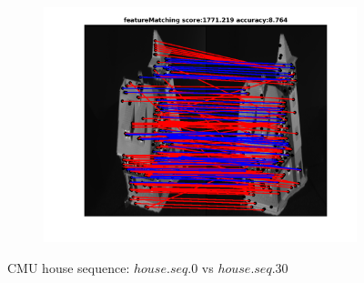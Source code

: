 \begin{figure}[h]
\begin{subfigure}[b]{0.3\textwidth}
		\includegraphics[scale=0.25]{"chapter3/fig/HouseSeq/anchor_descr/using_cpd_afftrafo/solution/fi_4_featureMatching"}  
	\end{subfigure} 		
	\caption{CMU house sequence: $house.seq.0$ vs $house.seq.30$}
\end{figure}
\vspace{-20pt}
